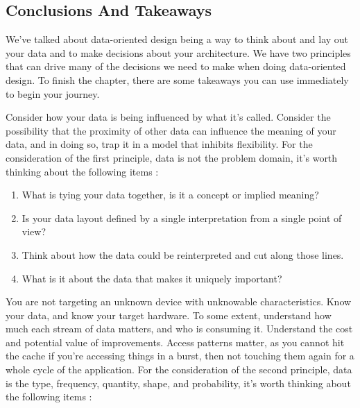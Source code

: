 \documentclass[a4paper,12pt]{book}
\begin{document}
\subsection{Conclusions And Takeaways}

We've talked about data-oriented design being a way to think about and lay out your data and to make decisions about your architecture.
We have two principles that can drive many of the decisions we need to make when doing data-oriented design.
To finish the chapter, there are some takeaways you can use immediately to begin your journey.

Consider how your data is being influenced by what it's called.
Consider the possibility that the proximity of other data can influence the meaning of your data, and in doing so, trap it in a model that inhibits flexibility.
For the consideration of the first principle, data is not the problem domain, it's worth thinking about the following items :

\begin{enumerate}
      \item
            What is tying your data together, is it a concept or implied meaning?
      \item
            Is your data layout defined by a single interpretation from a single point of view?
      \item
            Think about how the data could be reinterpreted and cut along those lines.
      \item
            What is it about the data that makes it uniquely important?
\end{enumerate}

You are not targeting an unknown device with unknowable characteristics.
Know your data, and know your target hardware.
To some extent, understand how much each stream of data matters, and who is consuming it.
Understand the cost and potential value of improvements.
Access patterns matter, as you cannot hit the cache if you're accessing things in a burst, then not touching them again for a whole cycle of the application.
For the consideration of the second principle, data is the type, frequency, quantity, shape, and probability, it's worth thinking about the following items :
\end{document}
